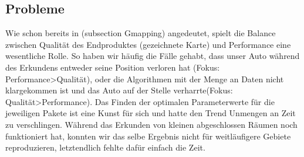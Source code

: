 \documentclass{article}
\begin{document}
\subsection{Probleme}
\label{subsec:probleme}
Wie schon bereits in (subsection Gmapping) angedeutet, spielt die Balance zwischen Qualität des Endproduktes (gezeichnete Karte) und Performance eine wesentliche Rolle. So haben wir häufig die Fälle gehabt, dass unser Auto während des Erkundens entweder seine Position verloren hat (Fokus: Performance>Qualität), oder die Algorithmen mit der Menge an Daten nicht klargekommen ist und das Auto auf der Stelle verharrte(Fokus: Qualität>Performance). Das Finden der optimalen Parameterwerte für die jeweiligen Pakete ist eine Kunst für sich und hatte den Trend Unmengen an Zeit zu verschlingen. Während das Erkunden von kleinen abgeschlossen Räumen noch funktioniert hat, konnten wir das selbe Ergebnis nicht für weitläufigere Gebiete reproduzieren, letztendlich fehlte dafür einfach die Zeit.
\end{document}
